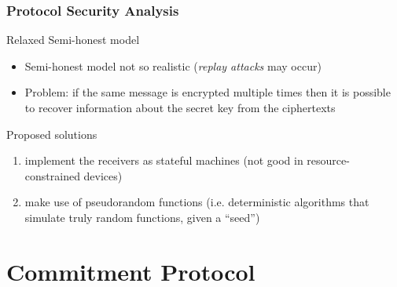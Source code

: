 \begin{frame}
 \frametitle{Protocol Security Analysis }
\begin{block}{Relaxed Semi-honest model}
   \begin{itemize}
    \item Semi-honest model not so realistic (\emph{replay attacks} may occur)
    \item \alert{Problem:} if the same message is encrypted multiple times then it is possible to recover information about the secret key from the ciphertexts\\
   \end{itemize}
  \end{block}

 \begin{block}{Proposed solutions}
    \begin{enumerate}
     \item implement the receivers as \alert{stateful} machines (not good in resource-constrained devices)
     \item make use of \alert{pseudorandom functions} (i.e. deterministic algorithms that simulate truly random functions, given a ``seed'')
    \end{enumerate}
 \end{block}
 
\end{frame}

\section{Commitment Protocol}

